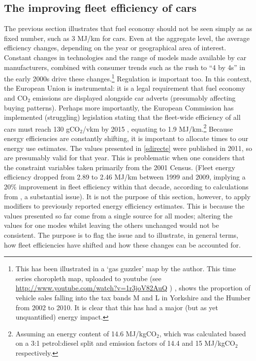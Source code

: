\subsection{The improving fleet efficiency of cars}
The previous section illustrates that fuel economy should not be seen simply as as
fixed number, such as 3 MJ/km for cars. Even at the aggregate level, the
average efficiency changes, depending on the year or 
geographical area of interest. Constant changes in technologies and
the range of models made available by car manufacturers, combined
with consumer trends such as the rush to ``4 by 4s'' in the early 2000s
drive these changes.\footnote{This has
been illustrated in a `gas guzzler' map by the author.
This time series choropleth map, uploaded to youtube
(see \url{http://www.youtube.com/watch?v=1r3joV82AuQ} ) ,
shows the proportion of
vehicle sales falling into the tax bands M and L in Yorkshire and the
Humber from 2002 to 2010. It is clear that this has had a major
(but as yet unquantified) energy impact.
}
Regulation is important too. In this context,
the European Union is instrumental: it is a legal
requirement that fuel economy and CO$_2$ emissions
are displayed alongside car adverts (presumably affecting buying patterns).
Perhaps more importantly, the European Commission has implemented
(struggling) legislation stating that the fleet-wide efficiency of
all cars must reach 130 gCO$_2$/vkm by 2015 \citep{Fontaras2010}, equating to
1.9 MJ/km.\footnote{Assuming an energy content of 14.6 MJ/kgCO$_2$,
which was calculated based on a 3:1 petrol:diesel split and
emission factors of 14.4 and 15 MJ/kgCO$_2$ respectively.
}
Because energy efficiencies are constantly shifting, it is important
to allocate times to our energy use estimates. The values presented in
\cref{sdirecte} were published in 2011, so are presumably valid for that
year. This is problematic when one considers that the constraint variables
taken primarily from the 2001 Census.
(Fleet energy efficiency dropped from 2.89 to 2.46 MJ/km between 1999 and 2009,
implying a 20\% improvement in fleet efficiency within that decade,
according to calculations from \citet[table 2.8]{Decc2011t}, a substantial issue).
It is not the purpose of this section, however, to apply modifiers to previously reported
energy efficiency estimates. This is because the values presented so far
come from a single source for all modes; altering the values for
one modes whilst leaving the others unchanged would not be consistent.
The purpose is to flag the issue and to
illustrate, in general terms, how fleet efficiencies have shifted and
how these changes can be accounted for.

